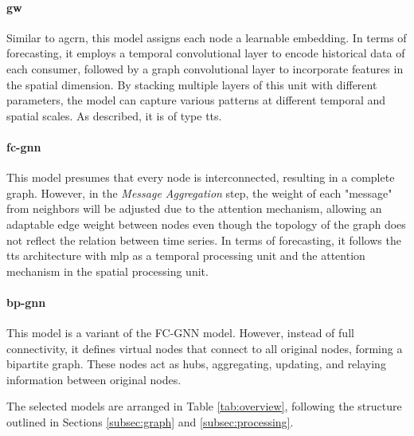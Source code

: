 \paragraph{\acrshort{gw}~\cite{lin_spatial-temporal_2021}} Similar to \acrshort{agcrn}, this model assigns each node a learnable embedding. In terms of forecasting, it employs a temporal convolutional layer to encode historical data of each consumer, followed by a graph convolutional layer to incorporate features in the spatial dimension. By stacking multiple layers of this unit with different parameters, the model can capture various patterns at different temporal and spatial scales. As described, it is of type \acrshort{tts}.  


\paragraph{\acrfull{fc-gnn}~\cite{satorras_multivariate_2022}} This model presumes that every node is interconnected, resulting in a complete graph. However, in the \textit{Message Aggregation} step, the weight of each "message" from neighbors will be adjusted due to the attention mechanism, allowing an adaptable edge weight between nodes even though the topology of the graph does not reflect the relation between time series. In terms of forecasting, it follows the \acrshort{tts} architecture with \acrshort{mlp} as a temporal processing unit and the attention mechanism in the spatial processing unit.

\paragraph{\acrfull{bp-gnn}~\cite{satorras_multivariate_2022}} This model is a variant of the FC-GNN model. However, instead of full connectivity, it defines virtual nodes that connect to all original nodes, forming a bipartite graph. These nodes act as hubs, aggregating, updating, and relaying information between original nodes.


The selected models are arranged in Table \ref{tab:overview}, following the structure outlined in Sections \ref{subsec:graph} and \ref{subsec:processing}.

